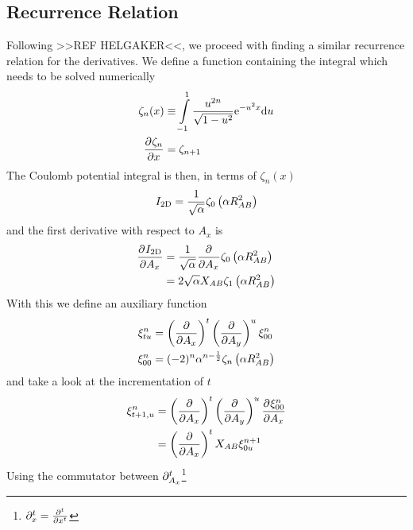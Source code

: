 \subsection{Recurrence Relation\label{sub:445}}
    Following >>REF HELGAKER<<, we proceed with finding a similar recurrence
    relation for the derivatives. We define a function containing the integral
    which needs to be solved numerically
        \begin{equation}
            \begin{aligned}
                \zeta_n(x) &\equiv \int\limits^1_{-1} \frac{u^{2n}}{\sqrt{1 -
                u^2}} \me^{-u^2x} \md u \\
                \prd{x}[\zeta_n] &= \zeta_{n+1}
            \end{aligned}
            \label{eq:zetaDef}
        \end{equation}
    The Coulomb potential integral is then, in terms of $\zeta_n(x)$
        \begin{equation}
            I_{\text{2D}} = \frac{1}{\sqrt{\alpha}} \zeta_0\left(\alpha R^2_{AB}\right)
        \end{equation}
    and the first derivative with respect to $A_x$ is
        \begin{align}
            \prd{A_x}[\twoDI] &= \frac{1}{\sqrt{\alpha}} \prd{A_x}
            \zeta_0\left(\alpha R^2_{AB}\right) \nonumber \\
            &= 2\sqrt{\alpha}X_{AB}\zeta_1\left(\alpha R^2_{AB}\right)
        \end{align}
    With this we define an auxiliary function
        \begin{equation}
            \begin{aligned}
                \xi^n_{tu} &=\left(\frac{\mathrm{\partial}}{\mathrm{\partial} A_x}\right)^{t}\left(\frac{\mathrm{\partial}}{\mathrm{\partial} A_y}\right)^{u} \xi^n_{00} \\
                \xi^n_{00} &= (-2)^n\alpha^{n-\frac{1}{2}} \zeta_n\left(\alpha
                R^2_{AB}\right)
            \end{aligned}
            \label{eq:auxiliary2d1}
        \end{equation}
    and take a look at the incrementation of $t$
        \begin{align}
            \xi^n_{t+1,u} &= \prdp{A_x}{t}\prdp{A_y}{u} \prd{A_x}[\xi^n_{00}]
            \nonumber \\
            &= \prdp{A_x}{t}X_{AB}\xi^{n+1}_{0u}
            \label{eq:Rtincr}
        \end{align}
    Using the commutator between
    $\mathrm{\partial}^t_{A_x}$\footnote{$\prtl^t_x=\prd{x}[][t]$}
